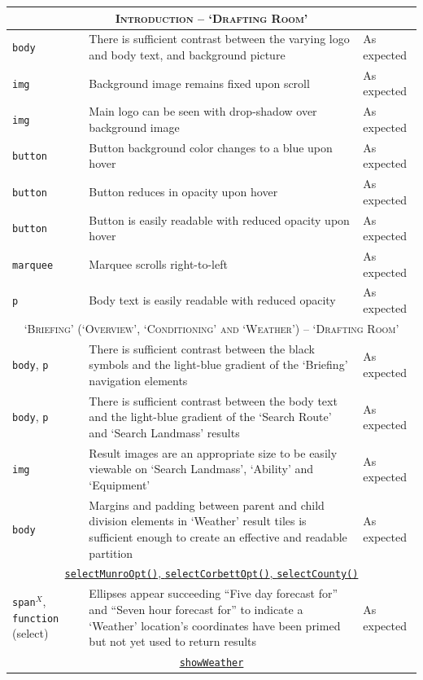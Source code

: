 \documentclass[11pt, english]{article}
\begin{document}
\begin{center}
\begin{longtable}{p{3cm}p{8cm}p{2cm}}
		\hline
		\multicolumn{3}{c}{\textsc{Introduction -- `Drafting Room'}}\\
		\hline
		\texttt{body} & There is sufficient contrast between the varying logo and body text, and background picture & As expected\\
		\texttt{img} & Background image remains fixed upon scroll & As expected\\
		\texttt{img} & Main logo can be seen with drop-shadow over background image & As expected\\
		\texttt{button} & Button background color changes to a blue upon hover & As expected\\
		\texttt{button} & Button reduces in opacity upon hover & As expected\\
		\texttt{button} & Button is easily readable with reduced opacity upon hover & As expected\\
		\texttt{marquee} & Marquee scrolls right-to-left & As expected\\
		\texttt{p} & Body text is easily readable with reduced opacity & As expected\\
		\hline
		\multicolumn{3}{c}{\textsc{`Briefing' (`Overview', `Conditioning' and `Weather') -- `Drafting Room'}}\\
		\hline
		\texttt{body}, \texttt{p} & There is sufficient contrast between the black symbols and the light-blue gradient of the `Briefing' navigation elements & As expected\\
		\texttt{body}, \texttt{p} & There is sufficient contrast between the body text and the light-blue gradient of the `Search Route' and `Search Landmass' results & As expected\\
		\texttt{img} & Result images are an appropriate size to be easily viewable on `Search Landmass', `Ability' and `Equipment' & As expected\\
		\texttt{body} & Margins and padding between parent and child division elements in `Weather' result tiles is sufficient enough to create an effective and readable partition & As expected\\
		\multicolumn{3}{c}{\underline{\texttt{selectMunroOpt()}, \texttt{selectCorbettOpt()}, \texttt{selectCounty()}}}\\
		\texttt{span}$^{X}$, \texttt{function} (select) & Ellipses appear succeeding ``Five day forecast for'' and ``Seven hour forecast for'' to indicate a `Weather' location's coordinates have been primed but not yet used to return results & As expected\\
		\multicolumn{3}{c}{\underline{\texttt{showWeather}}}\\

\end{longtable}
\end{center}
\end{document}
